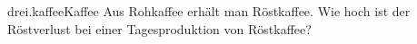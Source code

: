 \begin{exercise}{drei.kaffee}{Kaffee}
  \ifproblem\problem
    Aus  Rohkaffee erhält man  Röstkaffee. Wie hoch ist der
    Röstverlust bei einer Tagesproduktion von  Röstkaffee?
  \fi
\end{exercise}

